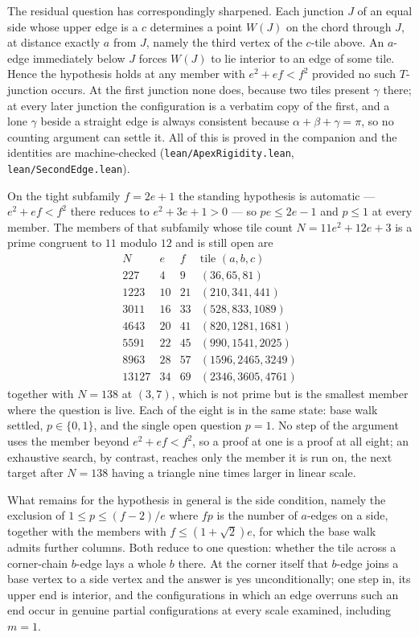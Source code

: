 \documentclass[11pt,reqno]{amsart}
\theoremstyle{plain}
\theoremstyle{definition}
\begin{document}
The residual question has correspondingly sharpened. Each junction $J$ of an equal side whose upper
edge is a $c$ determines a point $W(J)$ on the chord through $J$, at distance exactly $a$ from $J$,
namely the third vertex of the $c$-tile above. An $a$-edge immediately below $J$ forces $W(J)$ to lie
interior to an edge of some tile. Hence the hypothesis holds at any member with $e^{2}+ef<f^{2}$
provided no such $T$-junction occurs. At the first junction none does, because two tiles present
$\gamma$ there; at every later junction the configuration is a verbatim copy of the first, and a lone
$\gamma$ beside a straight edge is always consistent because $\alpha+\beta+\gamma=\pi$, so no counting
argument can settle it. All of this is proved in the companion and the identities are machine-checked
(\texttt{lean/ApexRigidity.lean}, \texttt{lean/SecondEdge.lean}).

On the tight subfamily $f=2e+1$ the standing hypothesis is automatic --- $e^{2}+ef<f^{2}$ there reduces
to $e^{2}+3e+1>0$ --- so $pe\le 2e-1$ and $p\le1$ at every member. The members of that subfamily whose
tile count $N=11e^{2}+12e+3$ is a prime congruent to $11$ modulo $12$ and is still open are
\[
\begin{array}{rrrl}
N & e & f & \text{tile }(a,b,c)\\\hline
227 & 4 & 9 & (36,65,81)\\
1223 & 10 & 21 & (210,341,441)\\
3011 & 16 & 33 & (528,833,1089)\\
4643 & 20 & 41 & (820,1281,1681)\\
5591 & 22 & 45 & (990,1541,2025)\\
8963 & 28 & 57 & (1596,2465,3249)\\
13127 & 34 & 69 & (2346,3605,4761)
\end{array}
\]
together with $N=138$ at $(3,7)$, which is not prime but is the smallest member where the question is
live. Each of the eight is in the same state: base walk settled, $p\in\{0,1\}$, and the single open
question $p=1$. No step of the argument uses the member beyond $e^{2}+ef<f^{2}$, so a proof at one is
a proof at all eight; an exhaustive search, by contrast, reaches only the member it is run on, the
next target after $N=138$ having a triangle nine times larger in linear scale.

What remains for the hypothesis in general is the side condition, namely the exclusion of
$1\le p\le(f-2)/e$ where $fp$ is the number of $a$-edges on a side, together with the members
with $f\le(1+\sqrt2)e$, for which the base walk admits further columns. Both reduce to one
question: whether the tile across a corner-chain $b$-edge lays a whole $b$ there. At the corner
itself that $b$-edge joins a base vertex to a side vertex and the answer is yes unconditionally;
one step in, its upper end is interior, and the configurations in which an edge overruns such an
end occur in genuine partial configurations at every scale examined, including $m=1$.
\end{document}
